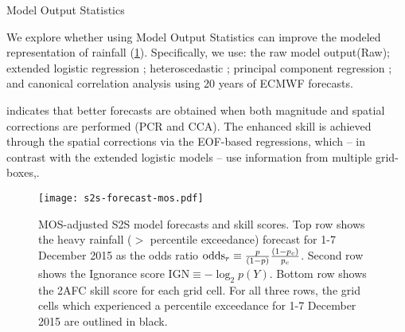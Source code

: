   \begin{block}{Model Output Statistics}

  We explore whether using Model Output Statistics \cite[MOS;][]{Glahn:1972vt} can improve the modeled representation of rainfall (\cref{fig:subs-prob-fcst}).
  Specifically, we use: the raw model output(Raw); extended logistic regression \cite[XLR;][]{Wilks:2009bk}; heteroscedastic \cite[HXLR;][]{Messner:2014gp}; principal component regression \cite[PCR;][]{Mason:2008da,Wilks:2006fx}; and canonical correlation analysis \cite[CCA;][]{Mason:2008da,Barnston:1992gd} using 20 years of ECMWF forecasts.

  \vspace{0.5cm}

   indicates that better forecasts are obtained when both magnitude and spatial corrections are performed (PCR and CCA).
  The enhanced skill is achieved through the spatial corrections via the EOF-based regressions, which -- in contrast with the extended logistic models -- use information from multiple grid-boxes,.

  \begin{mdframed}
  \begin{figure}
  	\noindent\texttt{[image: s2s-forecast-mos.pdf]}
  	\caption{
    MOS-adjusted S2S model forecasts and skill scores.
    Top row shows the heavy rainfall ($>$ percentile exceedance) forecast for 1-7 December 2015 as the odds ratio $\text{odds}_{r} \equiv \frac{p}{\qty(1 - p)} \frac{\qty(1 - p_c)}{p_c}$.
    Second row shows the Ignorance score $\text{IGN} \equiv - \log_2 p(Y)$.
    Bottom row shows the 2AFC skill score for each grid cell.
    For all three rows, the grid cells which experienced a  percentile exceedance for 1-7 December 2015 are outlined in black.
        \label{fig:subs-prob-fcst}
  	}
  \end{figure}
  \end{mdframed}
\end{block}
